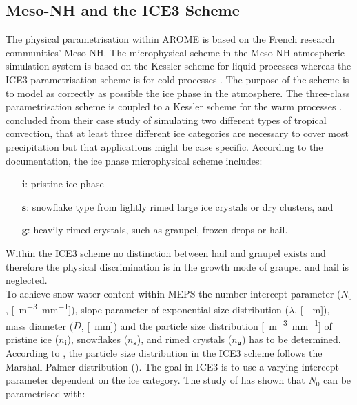 \subsection{Meso-NH and the ICE3 Scheme} \label{sec:MesoNH}
The physical parametrisation within AROME is based on the French research communities' Meso-NH. The microphysical scheme in the Meso-NH atmospheric simulation system is based on the Kessler scheme for liquid processes whereas the ICE3 parametrisation scheme is for cold processes \citep{meteo_france_meso-nh_2009}. The purpose of the scheme is to model as correctly as possible the ice phase in the atmosphere. The three-class parametrisation scheme is coupled to a Kessler scheme for the warm processes \citep{pinty_mixed-phased_1998}. \cite{mccumber_comparison_1991} concluded from their case study of simulating two different types of tropical convection, that at least three different ice categories are necessary to cover most precipitation but that applications might be case specific. 
According to the \cite{meteo_france_meso-nh_2009} documentation, the ice phase microphysical scheme includes: 
\begin{itemize}
	\item [$\mathbf{i}$:] pristine ice phase  
	\item [$\mathbf{s}$:] snowflake type from lightly rimed large ice crystals or dry clusters, and
	\item [$\mathbf{g}$:] heavily rimed crystals, such as graupel, frozen drops or hail.
\end{itemize}
% 
Within the ICE3 scheme no distinction between hail and graupel exists and therefore the physical discrimination is in the growth mode of graupel and hail is neglected. \\
To achieve snow water content within MEPS the number intercept parameter ($N_0$, [\SI{}{\metre^{-3}\per\mm}]), slope parameter of exponential size distribution ($\lambda$, [\SI{}{\per\metre}]), mass diameter ($D$, [\SI{}{\mm}]) and  the particle size distribution [\SI{}{\metre^{-3}\per\mm}] of pristine ice ($n_\mathbf{i}$), snowflakes ($n_\mathbf{s}$), and rimed crystals ($n_\mathbf{g}$)  has to be determined. 
According to \cite{caniaux_numerical_1994}, the particle size distribution in the ICE3 scheme follows the Marshall-Palmer distribution (). The goal in ICE3 is to use a varying intercept parameter dependent on the ice category. The study of \citet{caniaux_numerical_1994} has shown that $N_0$ can be parametrised with:
